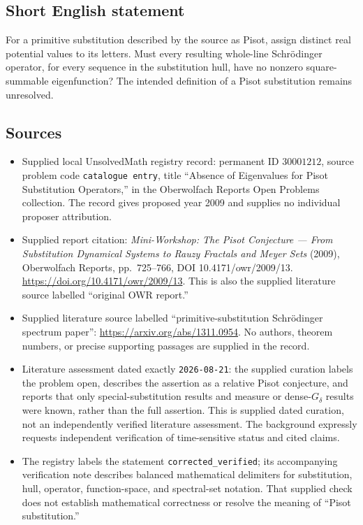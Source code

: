 \documentclass[11pt]{article}
\begin{document}
\subsection{Short English statement}
For a primitive substitution described by the source as Pisot, assign distinct real potential values to its letters. Must every resulting whole-line Schr\"odinger operator, for every sequence in the substitution hull, have no nonzero square-summable eigenfunction? The intended definition of a Pisot substitution remains unresolved.
\subsection{Sources}
\begin{itemize}
\item Supplied local UnsolvedMath registry record: permanent ID \(30001212\), source problem code \texttt{catalogue entry}, title ``Absence of Eigenvalues for Pisot Substitution Operators,'' in the Oberwolfach Reports Open Problems collection. The record gives proposed year 2009 and supplies no individual proposer attribution.
\item Supplied report citation: \emph{Mini-Workshop: The Pisot Conjecture --- From Substitution Dynamical Systems to Rauzy Fractals and Meyer Sets} (2009), Oberwolfach Reports, pp.~725--766, DOI 10.4171/owr/2009/13. \url{https://doi.org/10.4171/owr/2009/13}. This is also the supplied literature source labelled ``original OWR report.''
\item Supplied literature source labelled ``primitive-substitution Schr\"odinger spectrum paper'': \url{https://arxiv.org/abs/1311.0954}. No authors, theorem numbers, or precise supporting passages are supplied in the record.
\item Literature assessment dated exactly \texttt{2026-08-21}: the supplied curation labels the problem open, describes the assertion as a relative Pisot conjecture, and reports that only special-substitution results and measure or dense-\(G_\delta\) results were known, rather than the full assertion. This is supplied dated curation, not an independently verified literature assessment. The background expressly requests independent verification of time-sensitive status and cited claims.
\item The registry labels the statement \texttt{corrected\_verified}; its accompanying verification note describes balanced mathematical delimiters for substitution, hull, operator, function-space, and spectral-set notation. That supplied check does not establish mathematical correctness or resolve the meaning of ``Pisot substitution.''
\end{itemize}
\end{document}
